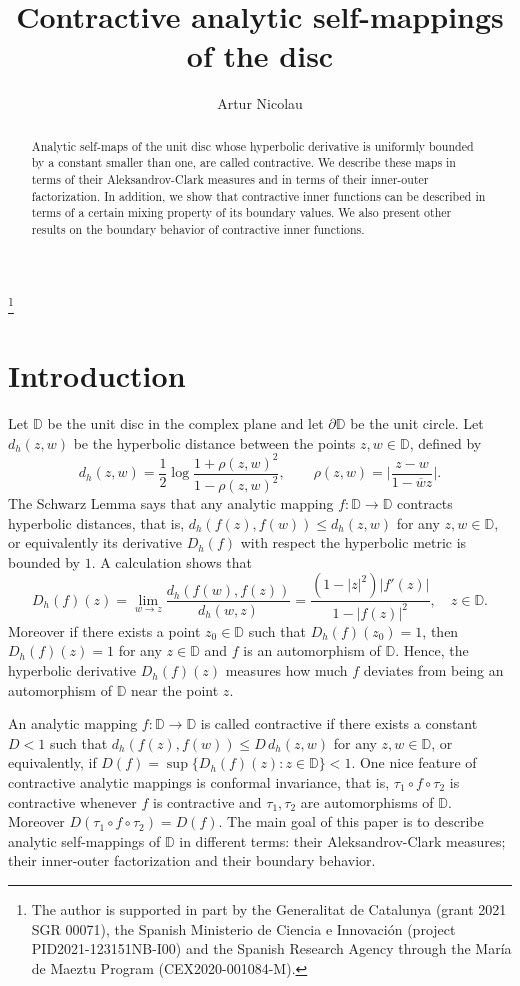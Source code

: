 \documentclass[a4paper,12pt]{article}
\title{Contractive analytic self-mappings of the disc }
\author{Artur Nicolau}
\date{}
\theoremstyle{definition}
\numberwithin{equation}{section}
\newcommand{\D}{\mathbb D}
\newcommand{\T}{\partial \mathbb{D}}
\begin{document}
 
\maketitle

\begin{abstract}
Analytic self-maps of the unit disc whose hyperbolic derivative is uniformly bounded by a constant smaller than one, are called contractive. We describe these maps in terms of their Aleksandrov-Clark measures and in terms of their inner-outer factorization. In addition, we show that contractive inner functions can be described in terms of a certain mixing property of its boundary values. We also present other results on the boundary behavior of contractive inner functions. 
\end{abstract}

\footnote{The author is supported in part by the Generalitat de Catalunya (grant 2021 SGR 00071), the Spanish Ministerio de Ciencia e Innovaci\'on (project PID2021-123151NB-I00) and the Spanish Research Agency through the Mar\'ia de Maeztu Program (CEX2020-001084-M).}


\section{Introduction}

Let $\D$ be the unit disc in the complex plane and let $\T$ be the unit circle. Let $d_h (z, w)$ be the hyperbolic distance between the points $z,w \in \D$, defined by 
$$
d_h (z,w) = \frac{1}{2} \log \frac{1+ \rho(z,w)^2}{1- \rho (z,w)^2}, \qquad \rho (z,w) = \bigg| \frac{z-w}{1- \overline{w}z}\bigg|.
$$
The Schwarz Lemma says that any analytic mapping $f: \D \rightarrow \D$ contracts hyperbolic distances, that is, $d_h (f(z), f(w)) \leq d_h (z,w)$ for any $z,w \in \D$, or equivalently its derivative $D_h (f)$ with respect the hyperbolic metric is bounded by $1$. A calculation shows that
$$
D_h (f) (z) = \lim_{w \to z } \frac{d_h (f(w), f(z))}{d_h (w,z)} =  \frac{(1-|z|^2) |f'(z)|}{1- |f(z)|^2}, \quad z \in \D .
$$
Moreover if there exists a point $z_0 \in \D$ such that $D_h (f) (z_0) = 1$, then $D_h (f) (z) =1$ for any $z \in \D$ and $f$ is an automorphism of $\D$. Hence, the hyperbolic derivative $D_h (f) (z)$ measures how much $f$ deviates from being an automorphism of $\D$ near the point $z$. 

An analytic mapping $f: \D \rightarrow \D$ is called contractive if there exists a constant $D<1$ such that $d_h (f(z), f(w)) \leq D \,  d_h (z,w)$ for any $z,w \in \D$, or equivalently, if $D(f)=\sup \{D_h (f) (z) : z \in \D \} < 1$. One nice feature of contractive analytic mappings is conformal invariance, that is, $\tau_1 \circ f \circ
\tau_2$ is contractive whenever $f$ is contractive and $\tau_1 , \tau_2$ are automorphisms of $\D$. Moreover $D(\tau_1 \circ f \circ \tau_2) = D(f)$. The main goal of this paper is to describe analytic self-mappings of $\D$ in different terms: their Aleksandrov-Clark measures; their inner-outer factorization and their boundary behavior. 
\end{document}
